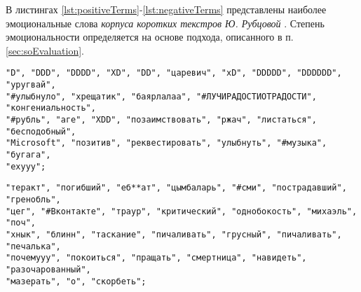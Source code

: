 
В листингах \ref{lst:positiveTerms}-\ref{lst:negativeTerms} представлены
наиболее эмоциональные слова {\it корпуса коротких текстров Ю. Рубцовой} \cite{rubtsovaCollection}.
Степень эмоциональности определяется на основе подхода, описанного в п.
\ref{sec:soEvaluation}.

\begin{lstlisting}[caption="Эмоционально положительные термы", label={lst:positiveTerms}]
"D", "DDD", "DDDD", "XD", "DD", "царевич", "xD", "DDDDD", "DDDDDD", "уругвай",
"#улыбнуло", "хрещатик", "баярлалаа", "#ЛУЧИРАДОСТИОТРАДОСТИ", "конгениальность",
"#рубль", "аге", "XDD", "позаимствовать", "ржач", "листаться", "бесподобный",
"Microsoft", "позитив", "реквестировать", "улыбнуть", "#музыка", "бугага",
"ехууу";
\end{lstlisting}

\begin{lstlisting}[caption="Эмоционально негативные термы", label={lst:negativeTerms}]
"теракт", "погибший", "еб**ат", "цымбаларь", "#сми", "пострадавший", "гренобль",
"цег", "#Вконтакте", "траур", "критический", "однобокость", "михаэль", "поч",
"хнык", "блинн", "таскание", "пичаливать", "грусный", "пичаливать", "печалька",
"почемууу", "покоиться", "пращать", "смертница", "навидеть", "разочарованный",
"мазерать", "о", "скорбеть";
\end{lstlisting}
